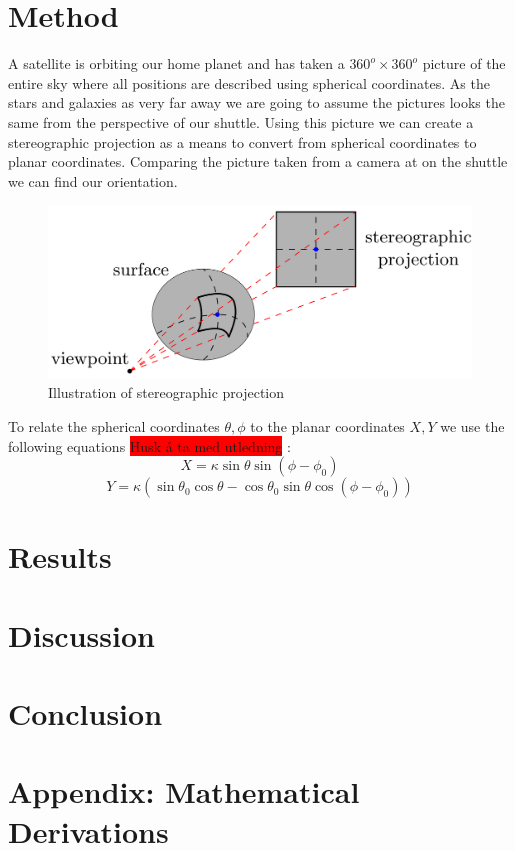 \documentclass[reprint,english,notitlepage]{revtex4-2}
\begin{document}
\section{Method} \label{sec:method}
A satellite is orbiting our home planet and has taken a $ 360 ^{o} × 360 ^{o} $ picture of the entire sky where all positions are described using spherical coordinates. As the stars and galaxies as very far away we are going to assume the pictures looks the same from the perspective of our shuttle. Using this picture we can create a stereographic projection as a means to convert from spherical coordinates to planar coordinates. Comparing the picture taken from a camera at on the shuttle we can find our orientation.   
\begin{figure}[h!]
  \centering
  \includegraphics[scale = .2]{Figures/Stereographic_projection.png}
  \caption{Illustration of stereographic projection}
  \label{fig: Stereographic Projection}
\end{figure}
To relate the spherical coordinates $ \theta, \phi $ to the planar coordinates $ X, Y $ we use the following equations \colorbox{red}{Husk å ta med utledning} :
\begin{equation} \label{Spherical to X}
	X = κ  \sin θ \sin (ϕ - ϕ _0)
\end{equation}
\begin{equation}\label{Spherical to Y}
	Y = κ (\sin θ _0 \cos  θ - \cos θ _0 \sin θ \cos (ϕ - ϕ _0))  
\end{equation}



\section{Results} \label{sec:results}



\section{Discussion} \label{sec:discussion}



\section{Conclusion} \label{sec:conclusion}






\section{Appendix: Mathematical Derivations}

\newpage 
\end{document}
